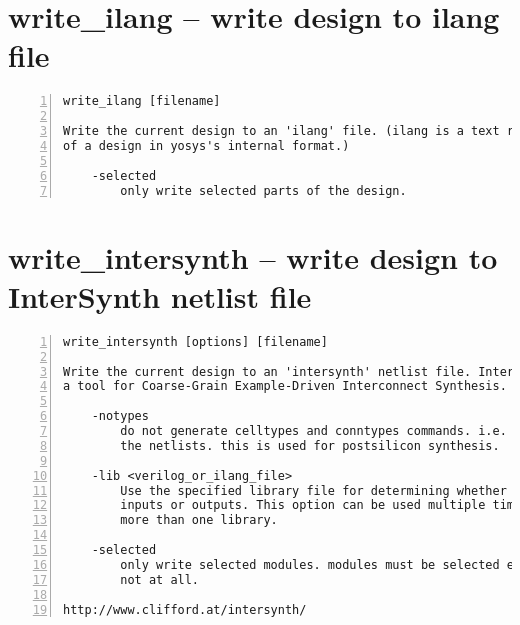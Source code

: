 \section{write\_ilang -- write design to ilang file}
\label{cmd:write_ilang}
\begin{lstlisting}[numbers=left,frame=single]
    write_ilang [filename]

Write the current design to an 'ilang' file. (ilang is a text representation
of a design in yosys's internal format.)

    -selected
        only write selected parts of the design.
\end{lstlisting}

\section{write\_intersynth -- write design to InterSynth netlist file}
\label{cmd:write_intersynth}
\begin{lstlisting}[numbers=left,frame=single]
    write_intersynth [options] [filename]

Write the current design to an 'intersynth' netlist file. InterSynth is
a tool for Coarse-Grain Example-Driven Interconnect Synthesis.

    -notypes
        do not generate celltypes and conntypes commands. i.e. just output
        the netlists. this is used for postsilicon synthesis.

    -lib <verilog_or_ilang_file>
        Use the specified library file for determining whether cell ports are
        inputs or outputs. This option can be used multiple times to specify
        more than one library.

    -selected
        only write selected modules. modules must be selected entirely or
        not at all.

http://www.clifford.at/intersynth/
\end{lstlisting}

